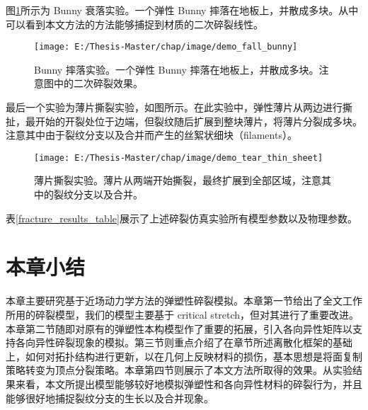 图\ref{demo_fall_bunny}所示为 Bunny 衰落实验。一个弹性 Bunny 摔落在地板上，并散成多块。从中可以看到本文方法的方法能够捕捉到材质的二次碎裂线性。

\begin{figure}[!htb]
  \centering
  \captionsetup{justification=centering}
  \texttt{[image: E:/Thesis-Master/chap/image/demo\_fall\_bunny]}

  \caption{\label{demo_fall_bunny}
           Bunny 摔落实验。一个弹性 Bunny 摔落在地板上，并散成多块。注意图中的二次碎裂效果。
          }
\end{figure}

最后一个实验为薄片撕裂实验，如图所示。在此实验中，弹性薄片从两边进行撕扯，最开始的开裂处位于边端，但裂纹随后扩展到整块薄片，将薄片分裂成多块。注意其中由于裂纹分支以及合并而产生的丝絮状细块（filaments）。

\begin{figure}[!htb]
  \centering
  \captionsetup{justification=centering}
  \texttt{[image: E:/Thesis-Master/chap/image/demo\_tear\_thin\_sheet]}

  \caption{\label{demo_tear_thin_sheet}
           薄片撕裂实验。薄片从两端开始撕裂，最终扩展到全部区域，注意其中的裂纹分支以及合并。
          }
\end{figure}

表\ref{fracture_results_table}展示了上述碎裂仿真实验所有模型参数以及物理参数。


\section{本章小结}

本章主要研究基于近场动力学方法的弹塑性碎裂模拟。本章第一节给出了全文工作所用的碎裂模型，我们的模型主要基于 critical stretch，但对其进行了重要改进。本章第二节随即对原有的弹塑性本构模型作了重要的拓展，引入各向异性矩阵以支持各向异性碎裂现象的模拟。第三节则重点介绍了在章节\label{discretization}所述离散化框架的基础上，如何对拓扑结构进行更新，以在几何上反映材料的损伤，基本思想是将面复制策略转变为顶点分裂策略。本章第四节则展示了本文方法所取得的效果。从实验结果来看，本文所提出模型能够较好地模拟弹塑性和各向异性材料的碎裂行为，并且能够很好地捕捉裂纹分支的生长以及合并现象。

